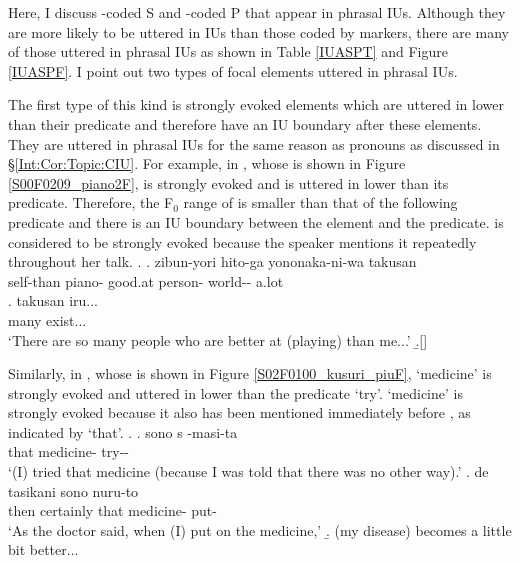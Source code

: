 Here, I discuss -coded S and -coded P that
appear in phrasal IUs.
Although they are more likely to be uttered in  IUs than 
those coded by  markers,
there are many of those uttered in phrasal IUs
as shown in Table \ref{IUASPT} and Figure \ref{IUASPF}.
I point out two types of focal elements uttered in phrasal IUs.

The first type of this kind is strongly evoked elements
which are uttered in lower  than their predicate and
therefore have an IU boundary after these elements.
They are uttered in phrasal IUs for the same reason as pronouns as discussed in \S \ref{Int:Cor:Topic:CIU}.
For example, in \Next, whose  is shown in Figure \ref{S00F0209_piano2F},
 is strongly evoked and is uttered in lower  than its predicate.
Therefore, the F$_{0}$ range of  is smaller than that of the following predicate and there is an IU boundary between the element  and the predicate.
 is considered to be strongly evoked
because the speaker mentions it repeatedly throughout her talk.
%
\ex.\label{S00F0209_piano2}
 \ag. zibun-yori  \tp{\dvline}  hito-ga yononaka-ni-wa takusan \tp{\dvline} \\
          self-than piano- {} good.at person- world-- a.lot {} \\
 \bg. takusan iru... \\
      many exist... \\
      `There are so many people who are better at (playing)  than me...'
 \b.[] 

Similarly, in \Next[a], whose  is shown in Figure \ref{S02F0100_kusuri_piuF},
 `medicine' is strongly evoked and uttered in lower  than the predicate  `try'.
 `medicine' is strongly evoked because
it also has been mentioned immediately before \Next[a],
as indicated by  `that'.
%
\ex.\label{S02F0100_kusuri}
 \ag. sono s  \tp{\dvline} -masi-ta \tp{\dvline} \\
       that  medicine- {} try-- {} \\
       `(I) tried that medicine (because I was told that there was no other way).'
  \bg. de \tp{\dvline} tasikani sono  nuru-to \tp{\dvline} \\
       then {} certainly that medicine- put- {} \\
       `As the doctor said, when (I) put on the medicine,'
  \b. (my disease) becomes a little bit better...

